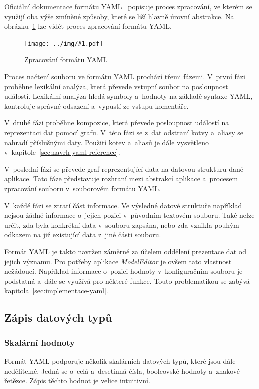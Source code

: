 \documentclass[FM,bw,DP]{tulthesis}
\newcommand{\includeimg}[2]{%
\begin{figure}[h]
	\centering
    \texttt{[image: ../img/\#1.pdf]}
    \caption{#2}
	\label{img:#1}
\end{figure}
}
\begin{document}
Oficiální dokumentace formátu \gls{YAML}~\cite{bib:yaml} popisuje proces zpracování, ve kterém se využijí oba výše zmíněné způsoby, které se liší hlavně úrovní abstrakce. Na obrázku~\ref{img:yaml} lze vidět proces zpracování formátu \gls{YAML}.

\includeimg{yaml}{Zpracování formátu YAML}

Proces načtení souboru ve formátu \gls{YAML} prochází třemi fázemi. V~první fázi proběhne lexikální analýza, která převede vstupní soubor na posloupnost událostí. Lexikální analýza hledá symboly a~hodnoty na základě syntaxe \gls{YAML}, kontroluje správné odsazení a~vypustí ze vstupu komentáře.

V~druhé fázi proběhne kompozice, která převede posloupnost událostí na reprezentaci dat pomocí grafu. V~této fázi se z~dat odstraní kotvy a~aliasy se nahradí příslušnými daty. Použití kotev a~aliasů je dále vysvětleno v~kapitole~\ref{sec:navrh-yaml-reference}.

V~poslední fázi se převede graf reprezentující data na datovou strukturu dané aplikace. Tato fáze představuje rozhraní mezi abstrakcí aplikace a~procesem zpracování souboru v~souborovém formátu \gls{YAML}.

V~každé fázi se ztratí část informace. Ve výsledné datové struktuře například nejsou žádné informace o~jejich pozici v~původním textovém souboru. Také nelze určit, zda byla konkrétní data v~souboru zapsána, nebo zda vznikla pouhým odkazem na již existující data z~jiné části souboru.

Formát \gls{YAML} je takto navržen záměrně za účelem oddělení prezentace dat od jejich významu. Pro potřeby aplikace \textit{ModelEditor} je ovšem tato vlastnost nežádoucí. Například informace o~pozici hodnoty v~konfiguračním souboru je podstatná a~dále se využívá pro některé funkce. Touto problematikou se zabývá kapitola~\ref{sec:implementace-yaml}.

\subsection{Zápis datových typů}
\label{sec:analyza-yaml-zapis-datovych-typu}

\subsubsection*{Skalární hodnoty}

Formát \gls{YAML} podporuje několik skalárních datových typů, které jsou dále nedělitelné. Jedná se o~celá a~desetinná čísla, booleovské hodnoty a~znakové řetězce. Zápis těchto hodnot je velice intuitivní. 
\end{document}
